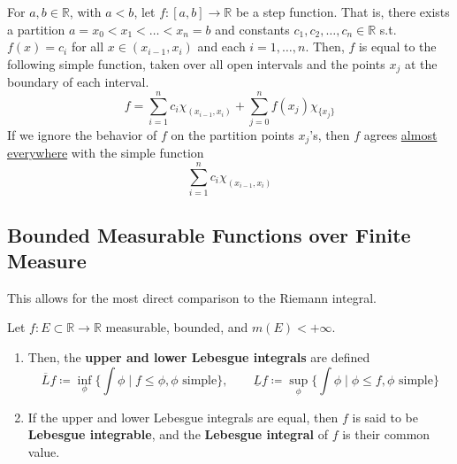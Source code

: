   \begin{example}
    \label{ex:step-function-as-simple-function}
    For $a, b \in \mathbb{R}$, with $a < b$, let $f: [a, b] \to \mathbb{R}$ be a step function. That is, there exists a partition $a = x_0 < x_1 < \ldots < x_n = b$ and constants $c_1, c_2, \ldots, c_n \in \mathbb{R}$ s.t. $f(x) = c_i$ for all $x \in (x_{i-1}, x_i)$ and each $i = 1, \ldots, n$. Then, $f$ is equal to the following simple function, taken over all open intervals and the points $x_j$ at the boundary of each interval. 
    \begin{equation}
      f = \sum_{i=1}^n c_i \chi_{(x_{i-1}, x_i)} + \sum_{j=0}^n f(x_j) \chi_{\{x_j\}}
    \end{equation}
    If we ignore the behavior of $f$ on the partition points $x_j$'s, then $f$ agrees \hyperref[def:almost_everywhere]{almost everywhere} with the simple function 
    \begin{equation}
      \sum_{i=1}^n c_i \chi_{(x_{i-1}, x_i)}
    \end{equation}
  \end{example} 

\subsection{Bounded Measurable Functions over Finite Measure} 

  This allows for the most direct comparison to the Riemann integral. 

  \begin{definition}
    \label{def:lower-upper-lebesgue-integral}
    Let $f: E \subset \mathbb{R} \to \mathbb{R}$ measurable, bounded, and $m(E) < +\infty$. 
    \begin{enumerate}
      \item Then, the \textbf{upper and lower Lebesgue integrals} are defined 
        \begin{equation}
          \overline{L} f \coloneqq \inf_{\phi} \bigg\{ \int \phi \; \bigg| \; f \leq \phi, \phi \text{ simple} \bigg\}, \qquad \underline{L} f \coloneqq \sup_{\phi} \bigg\{ \int \phi \; \bigg| \; \phi \leq f, \phi \text{ simple} \bigg\}
        \end{equation}

      \item If the upper and lower Lebesgue integrals are equal, then $f$ is said to be \textbf{Lebesgue integrable}, and the \textbf{Lebesgue integral} of $f$ is their common value. 
    \end{enumerate}
  \end{definition}


